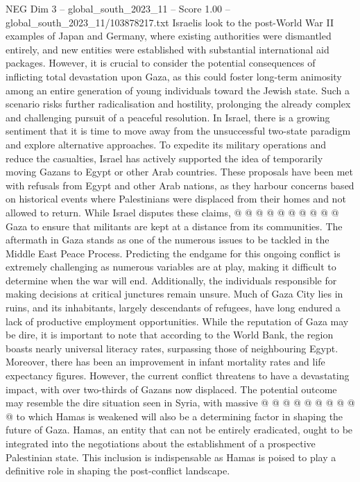 \begin{textsample}{NEG Dim 3 – global\_south\_2023\_11 – Score 1.00 – global\_south\_2023\_11/103878217.txt}
Israelis look to the post-World War II examples of Japan and Germany, where existing authorities were dismantled entirely, and new entities were established with substantial international aid packages.
However, it is crucial to consider the potential consequences of inflicting total devastation upon Gaza, as this could foster long-term animosity among an entire generation of young individuals toward the Jewish state.
Such a scenario risks further radicalisation and hostility, prolonging the already complex and challenging pursuit of a peaceful resolution.
In Israel, there is a growing sentiment that it is time to move away from the unsuccessful two-state paradigm and explore alternative approaches.
To expedite its military operations and reduce the casualties, Israel has actively supported the idea of temporarily moving Gazans to Egypt or other Arab countries.
These proposals have been met with refusals from Egypt and other Arab nations, as they harbour concerns based on historical events where Palestinians were displaced from their homes and not allowed to return.
While Israel disputes these claims, @ @ @ @ @ @ @ @ @ @ Gaza to ensure that militants are kept at a distance from its communities.
The aftermath in Gaza stands as one of the numerous issues to be tackled in the Middle East Peace Process.
Predicting the endgame for this ongoing conflict is extremely challenging as numerous variables are at play, making it difficult to determine when the war will end.
Additionally, the individuals responsible for making decisions at critical junctures remain unsure.
Much of Gaza City lies in ruins, and its inhabitants, largely descendants of refugees, have long endured a lack of productive employment opportunities.
While the reputation of Gaza may be dire, it is important to note that according to the World Bank, the region boasts nearly universal literacy rates, surpassing those of neighbouring Egypt.
Moreover, there has been an improvement in infant mortality rates and life expectancy figures.
However, the current conflict threatens to have a devastating impact, with over two-thirds of Gazans now displaced.
The potential outcome may resemble the dire situation seen in Syria, with massive @ @ @ @ @ @ @ @ @ @ to which Hamas is weakened will also be a determining factor in shaping the future of Gaza.
Hamas, an entity that can not be entirely eradicated, ought to be integrated into the negotiations about the establishment of a prospective Palestinian state.
This inclusion is indispensable as Hamas is poised to play a definitive role in shaping the post-conflict landscape.

\end{textsample}
